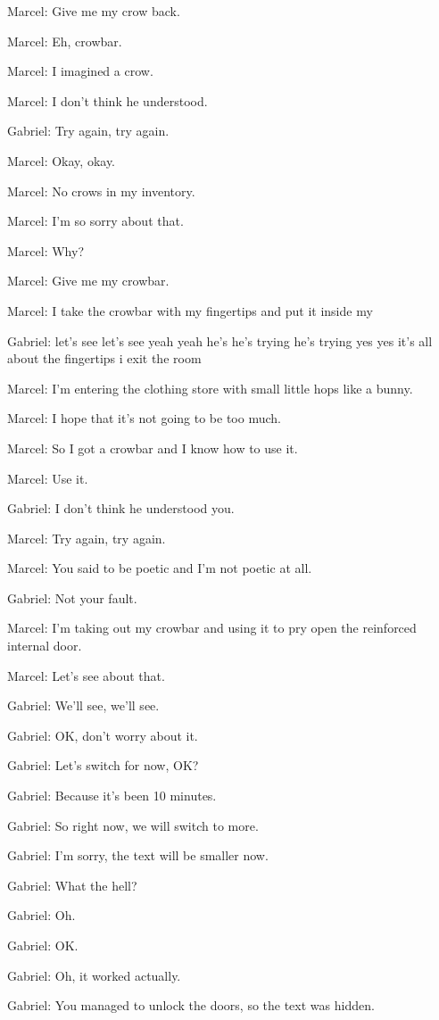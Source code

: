 Marcel: Give me my crow back.

Marcel: Eh, crowbar.

Marcel: I imagined a crow.

Marcel: I don't think he understood.

Gabriel: Try again, try again.

Marcel: Okay, okay.

Marcel: No crows in my inventory.

Marcel: I'm so sorry about that.

Marcel: Why?

Marcel: Give me my crowbar.

Marcel: I take the crowbar with my fingertips and put it inside my

Gabriel: let's see let's see yeah yeah he's he's trying he's trying yes yes it's all about the fingertips i exit the room

Marcel: I'm entering the clothing store with small little hops like a bunny.

Marcel: I hope that it's not going to be too much.

Marcel: So I got a crowbar and I know how to use it.

Marcel: Use it.

Gabriel: I don't think he understood you.

Marcel: Try again, try again.

Marcel: You said to be poetic and I'm not poetic at all.

Gabriel: Not your fault.

Marcel: I'm taking out my crowbar and using it to pry open the reinforced internal door.

Marcel: Let's see about that.

Gabriel: We'll see, we'll see.

Gabriel: OK, don't worry about it.

Gabriel: Let's switch for now, OK?

Gabriel: Because it's been 10 minutes.

Gabriel: So right now, we will switch to more.

Gabriel: I'm sorry, the text will be smaller now.

Gabriel: What the hell?

Gabriel: Oh.

Gabriel: OK.

Gabriel: Oh, it worked actually.

Gabriel: You managed to unlock the doors, so the text was hidden.

